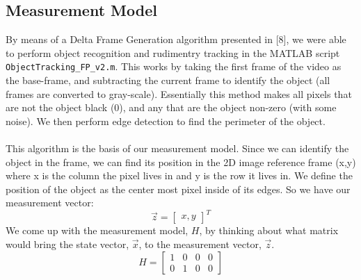 \documentclass{article} %
\begin{document}
\subsection{Measurement Model}
By means of a Delta Frame Generation algorithm presented in [8], we were able to perform object recognition and rudimentry tracking in the MATLAB script \texttt{ObjectTracking\_FP\_v2.m}. This works by taking the first frame of the video as the base-frame, and subtracting the current frame to identify the object (all frames are converted to gray-scale). Essentially this method makes all pixels that are not the object black (0), and any that are the object non-zero (with some noise). We then perform edge detection to find the perimeter of the object.\\\\
This algorithm is the basis of our measurement model. Since we can identify the object in the frame, we can find its position in the 2D image reference frame (x,y) where x is the column the pixel lives in and y is the row it lives in. We define the position of the object as the center most pixel inside of its edges. So we have our measurement vector:
\begin{equation}
\vec{z} = 
\begin{bmatrix}
 x, y
\end{bmatrix}^T
\end{equation}
We come up with the measurement model, $H$, by thinking about what matrix would bring the state vector, $\vec{x}$, to the measurement vector, $\vec{z}$.
\begin{equation}
 H =  
\begin{bmatrix}
 1 & 0 & 0 & 0 \\
 0 & 1 & 0 & 0 
\end{bmatrix}
\end{equation}
\end{document}
